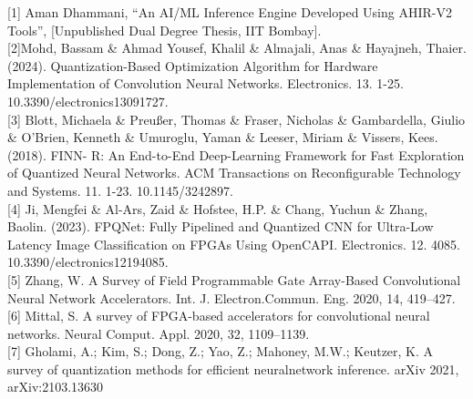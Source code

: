 \documentclass[12pt, a4paper, twoside, openright]{Thesis} %
\begin{document}
{%


\label{References}

\renewcommand\bibname{References}

[1] Aman Dhammani, “An AI/ML Inference Engine Developed Using AHIR-V2 Tools”, [Unpublished Dual Degree Thesis, IIT Bombay]. 
\\

 [2]Mohd, Bassam \& Ahmad Yousef, Khalil \& Almajali, Anas \& Hayajneh, Thaier. (2024). Quantization-Based {Optimization} Algorithm for Hardware Implementation of Convolution Neural Networks. Electronics. 13. 1-25. 10.3390/electronics13091727. \\
 
[3] Blott, Michaela \& Preußer, Thomas \& Fraser, Nicholas \& Gambardella, Giulio \& O'Brien, Kenneth \& Umuroglu, Yaman \& Leeser, Miriam \& Vissers, Kees. (2018). FINN- R: An End-to-End Deep-Learning Framework for Fast Exploration of Quantized Neural Networks. ACM Transactions on Reconfigurable Technology and Systems. 11. 1-23. 10.1145/3242897. \\

[4] Ji, Mengfei \& Al-Ars, Zaid \& Hofstee, H.P. \& Chang, Yuchun \& Zhang, Baolin. (2023). FPQNet: Fully Pipelined and Quantized CNN for Ultra-Low Latency Image Classification on FPGAs Using OpenCAPI. Electronics. 12. 4085. 10.3390/electronics12194085. 
\\

[5] Zhang, W. A Survey of Field Programmable Gate Array-Based Convolutional Neural Network Accelerators. Int. J. Electron.Commun. Eng. 2020, 14, 419–427.\\

[6] Mittal, S. A survey of FPGA-based accelerators for convolutional neural networks. Neural Comput. Appl. 2020, 32, 1109–1139. \\

[7] Gholami, A.; Kim, S.; Dong, Z.; Yao, Z.; Mahoney, M.W.; Keutzer, K. A survey of quantization methods for efficient neuralnetwork inference. arXiv 2021, arXiv:2103.13630   \\

}
\end{document}
